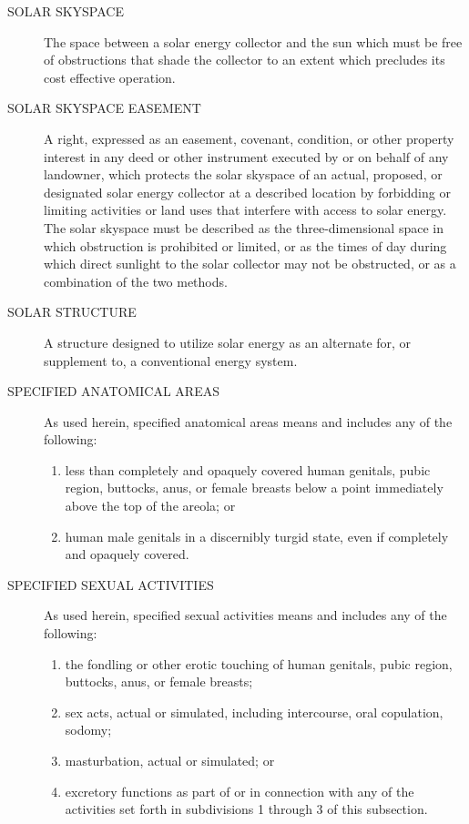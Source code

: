 \begin{description}
    \item[SOLAR SKYSPACE] The space between a solar energy collector and the sun which must be free of obstructions that shade the collector to an extent which precludes its cost effective operation.
    \item[SOLAR SKYSPACE EASEMENT] A right, expressed as an easement, covenant, condition, or other property interest in any deed or other instrument executed by or on behalf of any landowner, which protects the solar skyspace of an actual, proposed, or designated solar energy collector at a described location by forbidding or limiting activities or land uses that interfere with access to solar energy. The solar skyspace must be described as the three-dimensional space in which obstruction is prohibited or limited, or as the times of day during which direct sunlight to the solar collector may not be obstructed, or as a combination of the two methods.
    \item[SOLAR STRUCTURE] A structure designed to utilize solar energy as an alternate for, or supplement to, a conventional energy system.
    \item[SPECIFIED ANATOMICAL AREAS] As used herein, specified anatomical areas means and includes any of the following:
        \begin{enumerate}[{\indent}1)]
            \item less than completely and opaquely covered human genitals, pubic region, buttocks, anus, or female breasts below a point immediately above the top of the areola; or
            \item human male genitals in a discernibly turgid state, even if completely and opaquely covered.
        \end{enumerate}
    \item[SPECIFIED SEXUAL ACTIVITIES] As used herein, specified sexual activities means and includes any of the following:
        \begin{enumerate}[{\indent}1)]
            \item the fondling or other erotic touching of human genitals, pubic region, buttocks, anus, or female breasts;
            \item sex acts, actual or simulated, including intercourse, oral copulation, sodomy;
            \item masturbation, actual or simulated; or
            \item excretory functions as part of or in connection with any of the activities set forth in subdivisions 1 through 3 of this subsection.

\end{enumerate}
\end{description}
